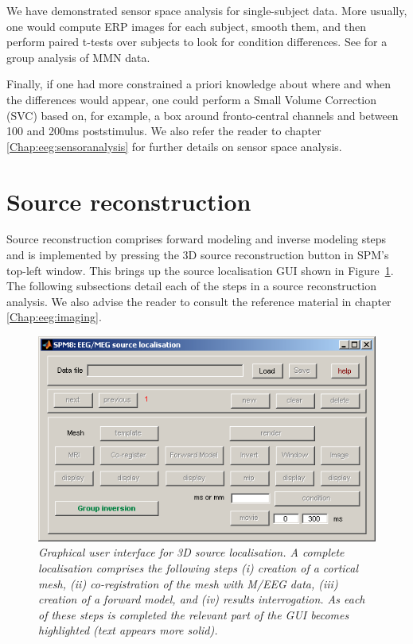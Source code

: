 We have demonstrated sensor space analysis for single-subject data. More usually, one would compute ERP images for each subject, smooth them, and then perform paired t-tests over subjects to look for condition differences. See \cite{marta_mmndcm} for a group analysis of MMN data.
 
Finally, if one had more constrained a priori knowledge about where and when the differences would appear, one could perform a Small Volume Correction (SVC) based on, for example, a box around fronto-central channels and between 100 and 200ms poststimulus. We also refer the reader to chapter \ref{Chap:eeg:sensoranalysis} for further details on sensor space analysis.

\section{Source reconstruction}

Source reconstruction comprises forward modeling and inverse modeling steps and is implemented by pressing the 3D source reconstruction button in SPM's top-left window.
This brings up the source localisation GUI shown in Figure~\ref{source_gui}. The following subsections detail each of the steps in a source reconstruction analysis. We also advise the reader to consult the reference material in chapter \ref{Chap:eeg:imaging}.

\begin{figure}
\begin{center}
\includegraphics[width=120mm]{mmn/source_gui}
\caption{\em Graphical user interface for 3D source localisation. A complete localisation comprises the following steps (i) creation of a cortical mesh, (ii) co-registration of the mesh with M/EEG data, (iii) creation of a forward model, and (iv) results interrogation. As each of these steps is completed the relevant part of the GUI becomes highlighted (text appears more solid).
\label{source_gui}}
\end{center}
\end{figure}

